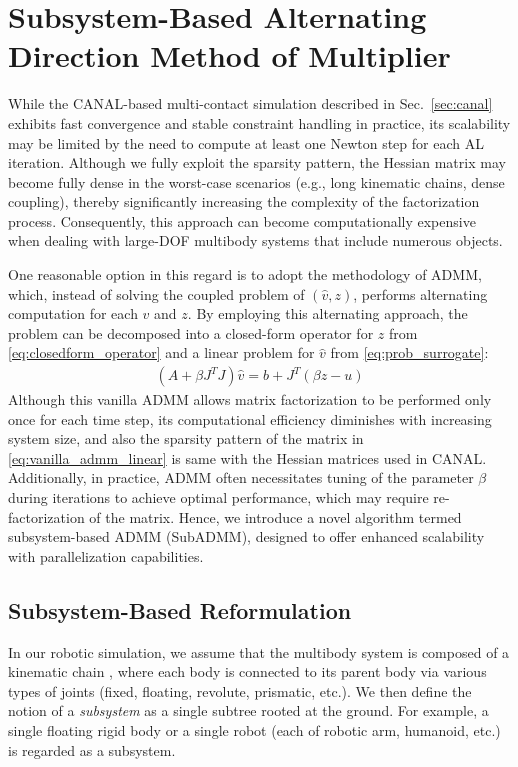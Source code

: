 \documentclass[lettersize,journal]{IEEEtran}
\begin{document}
\section{Subsystem-Based Alternating Direction Method of Multiplier}
\label{sec:subadmm}

While the CANAL-based multi-contact simulation described in Sec.~\ref{sec:canal} exhibits fast convergence and stable constraint handling in practice, its scalability may be limited by the need to compute at least one Newton step for each AL iteration. 
Although we fully exploit the sparsity pattern, the Hessian matrix may become fully dense in the worst-case scenarios (e.g., long kinematic chains, dense coupling), thereby significantly increasing the complexity of the factorization process.
Consequently, this approach can become computationally expensive when dealing with large-DOF multibody systems that include numerous objects.


One reasonable option in this regard is to adopt the methodology of ADMM, which, instead of solving the coupled problem of $(\hat{v}, z)$, performs alternating computation for each $\hat{v}$ and $z$.
By employing this alternating approach, the problem can be decomposed into a closed-form operator for $z$ from \eqref{eq:closedform_operator} and a linear problem for $\hat{v}$ from \eqref{eq:prob_surrogate}:
\begin{align} \label{eq:vanilla_admm_linear}
    (A+\beta J^TJ)\hat{v} = b + J^T(\beta z - u)
\end{align}
Although this vanilla ADMM allows matrix factorization to be performed only once for each time step, its computational efficiency diminishes with increasing system size, and also the sparsity pattern of the matrix in \eqref{eq:vanilla_admm_linear} is same with the Hessian matrices used in CANAL. 
Additionally, in practice, ADMM often necessitates tuning of the parameter $\beta$ during iterations to achieve optimal performance, which may require re-factorization of the matrix.
Hence, we introduce a novel algorithm termed subsystem-based ADMM (SubADMM), designed to offer enhanced scalability with parallelization capabilities.

\subsection{Subsystem-Based Reformulation} \label{subsec:subadmm_reformulation}

In our robotic simulation, we assume that the multibody system is composed of a kinematic chain \cite{featherstone2014rigid}, where each body is connected to its parent body via various types of joints (fixed, floating, revolute, prismatic, etc.). 
We then define the notion of a \textit{subsystem} as a single subtree rooted at the ground. For example, a single floating rigid body or a single robot (each of robotic arm, humanoid, etc.) is regarded as a subsystem.
\end{document}
